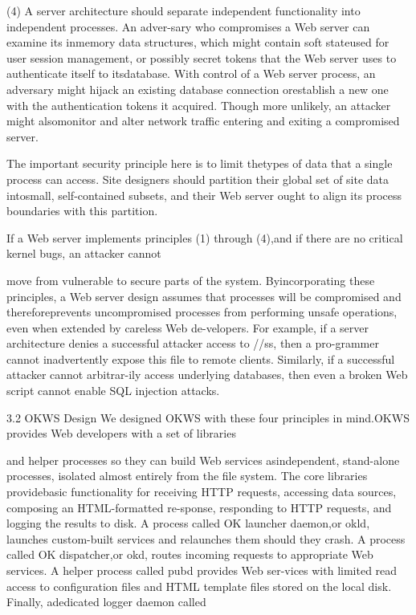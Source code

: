 (4) A server architecture should separate independent functionality into independent processes. An adver-sary who compromises a Web server can examine its inmemory data structures, which might contain soft stateused for user session management, or possibly secret tokens that the Web server uses to authenticate itself to itsdatabase. With control of a Web server process, an adversary might hijack an existing database connection orestablish a new one with the authentication tokens it acquired. Though more unlikely, an attacker might alsomonitor and alter network traffic entering and exiting a
compromised server.

The important security principle here is to limit thetypes of data that a single process can access. Site designers should partition their global set of site data intosmall, self-contained subsets, and their Web server ought
to align its process boundaries with this partition.

If a Web server implements principles (1) through (4),and if there are no critical kernel bugs, an attacker cannot

move from vulnerable to secure parts of the system. Byincorporating these principles, a Web server design assumes that processes will be compromised and thereforeprevents uncompromised processes from performing unsafe operations, even when extended by careless Web de-velopers. For example, if a server architecture denies a
successful attacker access to /\Gamma \Delta \Pi /\Sigma \Upsilon ss\Phi \Xi , then a pro-grammer cannot inadvertently expose this file to remote
clients. Similarly, if a successful attacker cannot arbitrar-ily access underlying databases, then even a broken Web
script cannot enable SQL injection attacks.

3.2 OKWS Design
We designed OKWS with these four principles in mind.OKWS provides Web developers with a set of libraries

and helper processes so they can build Web services asindependent, stand-alone processes, isolated almost entirely from the file system. The core libraries providebasic functionality for receiving HTTP requests, accessing data sources, composing an HTML-formatted re-sponse, responding to HTTP requests, and logging the
results to disk. A process called OK launcher daemon,or okld, launches custom-built services and relaunches
them should they crash. A process called OK dispatcher,or okd, routes incoming requests to appropriate Web services. A helper process called pubd provides Web ser-vices with limited read access to configuration files and
HTML template files stored on the local disk. Finally, adedicated logger daemon called

